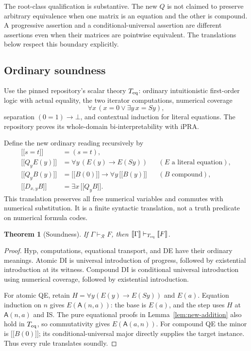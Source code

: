 \documentclass[11pt,a4paper]{article}
\newtheorem{theorem}{Theorem}[section]
\theoremstyle{definition}\newtheorem{definition}[theorem]{Definition}
\newcommand{\llbracket}{\mathopen{[\![}}
\newcommand{\rrbracket}{\mathclose{]\!]}}
\begin{document}
The root-class qualification is substantive.  The new $Q$ is not claimed to
preserve arbitrary equivalence when one matrix is an equation and the other
is compound.  A progressive assertion and a conditional-universal assertion
are different assertions even when their matrices are pointwise equivalent.
The translations below respect this boundary explicitly.

\subsection{Ordinary soundness}
\label{subsec:new-soundness}

Use the pinned repository's scalar theory $T_{\rm eq}$: ordinary
intuitionistic first-order logic with actual equality, the two iterator
computations, numerical coverage
\[
 \forall x\,(x=0\lor\exists y\,x=Sy),
\]
separation $(0=1)\to\bot$, and contextual induction for literal equations.
The repository proves its whole-domain bi-interpretability with iPRA.\cite{bridge}

Define the new ordinary reading recursively by
\begin{equation}
 \begin{aligned}
 \llbracket s=t\rrbracket&=(s=t),\\
 \llbracket Q_yE(y)\rrbracket
   &=\forall y\,(E(y)\to E(Sy))
       &&(E\text{ a literal equation}),\\
 \llbracket Q_yB(y)\rrbracket
   &=\llbracket B(0)\rrbracket\to
                  \forall y\,\llbracket B(y)\rrbracket
       &&(B\text{ compound}),\\
 \llbracket D_{x,y}B\rrbracket
   &=\exists x\,\llbracket Q_yB\rrbracket.
 \end{aligned}
 \label{eq:new-reading}
\end{equation}
This translation preserves all free numerical variables and commutes with
numerical substitution.  It is a finite syntactic translation, not a truth
predicate on numerical formula codes.

\begin{theorem}[Soundness]
\label{thm:new-soundness}
If $\Gamma\vdash_{\mathcal R}F$, then
$\llbracket\Gamma\rrbracket\vdash_{T_{\rm eq}}\llbracket F\rrbracket$.
\end{theorem}
\begin{proof}
Hyp, computations, equational transport, and DE have their ordinary meanings.
Atomic DI is universal introduction of progress, followed by existential
introduction at its witness.  Compound DI is conditional universal
introduction using numerical coverage, followed by existential introduction.

For atomic QE, retain
$H=\forall y(E(y)\to E(Sy))$ and $E(a)$.
Equation induction on $n$ gives $E(\mathsf A(n,a))$: the base is $E(a)$,
and the step uses $H$ at $\mathsf A(n,a)$ and IS.  The pure equational
proofs in Lemma~\ref{lem:new-addition} also hold in $T_{\rm eq}$, so
commutativity gives $E(\mathsf A(a,n))$.  For compound QE the minor is
$\llbracket B(0)\rrbracket$; its conditional-universal major directly
supplies the target instance.  Thus every rule translates soundly.
\end{proof}
\end{document}
